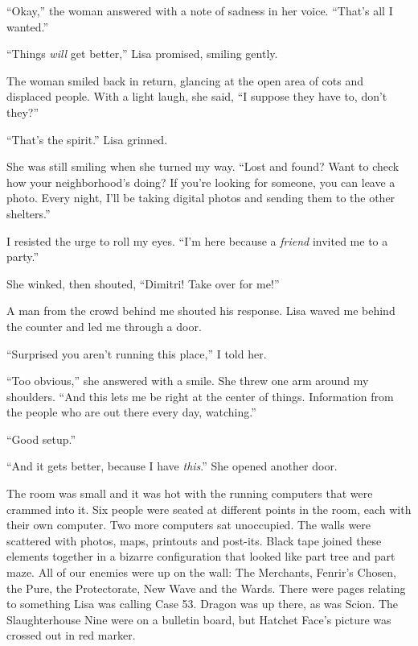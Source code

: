 ``Okay,'' the woman answered with a note of sadness in her voice. ``That's all I wanted.''



``Things \emph{will} get better,'' Lisa promised, smiling gently.



The woman smiled back in return, glancing at the open area of cots and displaced people.  With a light laugh, she said, ``I suppose they have to, don't they?''



``That's the spirit.'' Lisa grinned.



She was still smiling when she turned my way.  ``Lost and found?  Want to check how your neighborhood's doing?  If you're looking for someone, you can leave a photo.  Every night, I'll be taking digital photos and sending them to the other shelters.''



I resisted the urge to roll my eyes.  ``I'm here because a \emph{friend} invited me to a party.''



She winked, then shouted, ``Dimitri!  Take over for me!''



A man from the crowd behind me shouted his response.  Lisa waved me behind the counter and led me through a door.



``Surprised you aren't running this place,'' I told her.



``Too obvious,'' she answered with a smile.  She threw one arm around my shoulders.  ``And this lets me be right at the center of things.  Information from the people who are out there every day, watching.''



``Good setup.''



``And it gets better, because I have \emph{this}.''  She opened another door.



The room was small and it was hot with the running computers that were crammed into it.  Six people were seated at different points in the room, each with their own computer.  Two more computers sat unoccupied.  The walls were scattered with photos, maps, printouts and post-its.  Black tape joined these elements together in a bizarre configuration that looked like part tree and part maze.  All of our enemies were up on the wall: The Merchants, Fenrir's Chosen, the Pure, the Protectorate, New Wave and the Wards.  There were pages relating to something Lisa was calling Case 53.  Dragon was up there, as was Scion.  The Slaughterhouse Nine were on a bulletin board, but Hatchet Face's picture was crossed out in red marker.



